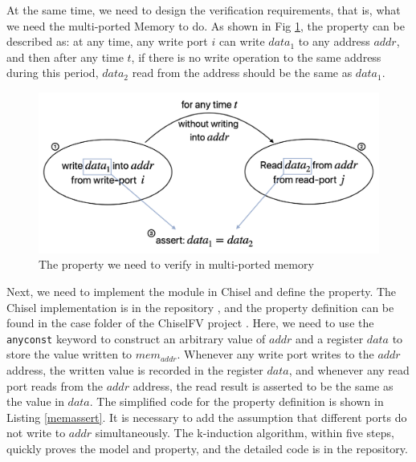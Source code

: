 \documentclass[conference]{IEEEtran}
\theoremstyle{definition}
\begin{document}
At the same time, we need to design the verification requirements, that is, what we need the multi-ported Memory to do. As shown in Fig \ref{fig: memverify}, the property can be described as: at any time, any write port $i$ can write $data_1$ to any address $addr$, and then after any time $t$, if there is no write operation to the same address during this period, $data_2$ read from the address should be the same as $data_1$.

\begin{figure}[!htbp]
    \begin{center}
    \includegraphics[width=1\linewidth]{pics/memverify.png}
    \caption{The property we need to verify in multi-ported memory}
    \label{fig: memverify}
    \end{center}
\end{figure}

Next, we need to implement the module in Chisel and define the property. 
The Chisel implementation is in the repository \cite{mpMemory}, and the property definition can be found in the case folder of the ChiselFV project \cite{ChiselFV}.
Here, we need to use the \verb|anyconst| keyword to construct an arbitrary value of $addr$ and a register $data$ to store the value written to $mem_{addr}$. Whenever any write port writes to the $addr$ address, the written value is recorded in the register $data$, and whenever any read port reads from the $addr$ address, the read result is asserted to be the same as the value in $data$.
The simplified code for the property definition is shown in Listing \ref{memassert}. It is necessary to add the assumption that different ports do not write to $addr$ simultaneously.
The k-induction algorithm, within five steps, quickly proves the model and property, and the detailed code is in the repository.
\end{document}
